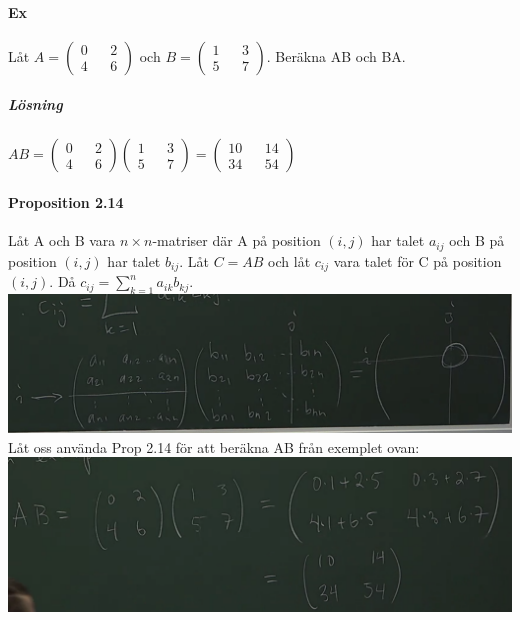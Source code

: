 \paragraph{Ex} Låt $A=\begin{pmatrix}0&&2\\4&&6\end{pmatrix}$ och $B=\begin{pmatrix}1&&3\\5&&7\end{pmatrix}$.
Beräkna AB och BA.
\subparagraph{Lösning} 
$AB=\begin{pmatrix}
    0&&2\\4&&6
\end{pmatrix}
\begin{pmatrix}
    1&&3\\5&&7
\end{pmatrix}=
\begin{pmatrix}
    10&&14\\34&&54
\end{pmatrix}$

\paragraph{Proposition 2.14} Låt A  och B vara $n\times n$-matriser där A på position $(i,j)$ har talet $a_{ij}$ och B på position $(i,j)$ har talet $b_{ij}$.
Låt $C=AB$ och låt $c_{ij}$ vara talet för C på position $(i,j)$.
Då $c_{ij}=\sum^{n}_{k=1}a_{ik}b_{kj}$.\\
\includegraphics[scale=0.3]{imgs/22-01-31-img01.png}\\
Låt oss använda Prop 2.14 för att beräkna AB från exemplet ovan:\\
\includegraphics[scale=0.3]{imgs/22-01-31-img02.png}\\
